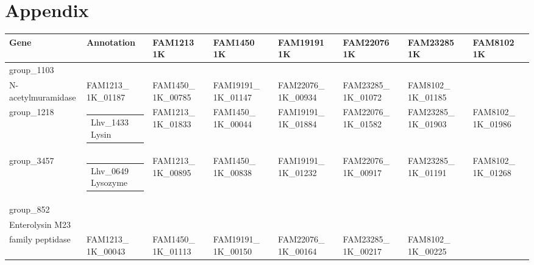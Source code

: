 \documentclass[10pt,a4paper]{article}
\begin{document}
\newpage


\begin{multicols}{2}
	{}
	
\end{multicols}	

\appendix
\setcounter{table}{0}  


\part*{\Large Appendix}
\begin{landscape}
	\begin{table}[h]
		\begin{tabularx}{\linewidth}{|l|l|X|X|X|X|X|X|}\hline
			Gene & Annotation & FAM1213 1K & FAM1450 1K & FAM19191 1K & FAM22076 1K & FAM23285 1K & FAM8102 1K \\\hline
			
			group\_1103 & \begin{tabular}[c]{@{}l@{}}Lhv\_0549 \\N-acetylmuramidase \end{tabular} & FAM1213\_ 1K\_01187 & FAM1450\_ 1K\_00785 & FAM19191\_ 1K\_01147 & FAM22076\_ 1K\_00934 & FAM23285\_ 1K\_01072 & FAM8102\_ 1K\_01185 \\\hline
			
			group\_1218 & \begin{tabular}[c]{@{}l@{}}Lhv\_1433 Lysin \end{tabular} & FAM1213\_ 1K\_01833 & FAM1450\_ 1K\_00044 & FAM19191\_ 1K\_01884 & FAM22076\_ 1K\_01582 & FAM23285\_ 1K\_01903 & FAM8102\_ 1K\_01986 \\\hline
			
			group\_3457 & \begin{tabular}[c]{@{}l@{}}Lhv\_0649 Lysozyme \end{tabular} & FAM1213\_ 1K\_00895 & FAM1450\_ 1K\_00838 & FAM19191\_ 1K\_01232 & FAM22076\_ 1K\_00917 & FAM23285\_ 1K\_01191 & FAM8102\_ 1K\_01268 \\\hline
			
			group\_852 & \begin{tabular}[c]{@{}l@{}}Lhv\_1295 \\Enterolysin M23 \\family peptidase \end{tabular} & FAM1213\_ 1K\_00043 & FAM1450\_ 1K\_01113 & FAM19191\_ 1K\_00150 & FAM22076\_ 1K\_00164 & FAM23285\_ 1K\_00217 & FAM8102\_ 1K\_00225 \\\hline
			

\end{tabularx}
\end{table}
\end{landscape}
\end{document}

